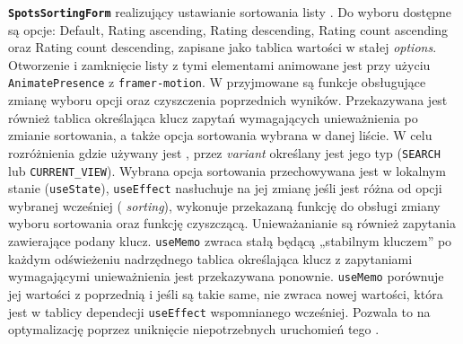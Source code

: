 \textbf{\texttt{SpotsSortingForm}}
 realizujący ustawianie sortowania listy .
Do wyboru dostępne są opcje: Default, Rating ascending, Rating descending, Rating count ascending oraz Rating count descending,
zapisane jako tablica wartości w stałej \emph{options}.
Otworzenie i zamknięcie listy z tymi elementami animowane jest przy użyciu 
\texttt{AnimatePresence} z  \texttt{framer-motion}.
W  przyjmowane są funkcje obsługujące zmianę wyboru opcji oraz czyszczenia poprzednich wyników.
Przekazywana jest również tablica określająca klucz zapytań wymagających unieważnienia po zmianie sortowania, a także
opcja sortowania wybrana w danej liście.
W celu rozróżnienia gdzie używany jest , przez  \emph{variant}
określany jest jego typ (\texttt{SEARCH} lub \texttt{CURRENT\_VIEW}).
Wybrana opcja sortowania przechowywana jest w lokalnym stanie (\texttt{useState}),  \texttt{useEffect}
nasłuchuje na jej zmianę jeśli jest różna od opcji wybranej wcześniej ( \emph{sorting}), wykonuje
przekazaną funkcję do obsługi zmiany wyboru sortowania oraz funkcję czyszczącą.
Unieważanianie są również zapytania zawierające podany klucz.
 \texttt{useMemo} zwraca stałą będącą „stabilnym kluczem” \textendash \space po każdym odświeżeniu
 nadrzędnego tablica określająca klucz z zapytaniami wymagającymi unieważnienia jest
przekazywana ponownie.
\texttt{useMemo} porównuje jej wartości z poprzednią i jeśli są takie same, nie zwraca nowej wartości, która jest w
tablicy dependecji \texttt{useEffect} wspomnianego wcześniej.
Pozwala to na optymalizację poprzez uniknięcie niepotrzebnych uruchomień tego .
